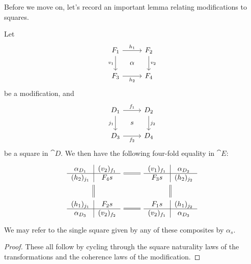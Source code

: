 \documentclass[DynamicalBook]{subfiles}
\begin{document}
Before we move on, let's record an important lemma relating modifications to squares.
\begin{lemma}
  Let
  \[
        \begin{tikzcd}[sep=tiny]
          F_1 \ar[dd, "v_1"'] \ar[rr, "h_1"] & & F_2
 \ar[dd, "v_2"] \\
           & \alpha & \\
          F_3 \ar[rr, "h_2"'] & & F_4
        \end{tikzcd}
  \]
  be a modification, and
  \[
        \begin{tikzcd}[sep=tiny]
          D_1 \ar[dd, "j_1"'] \ar[rr, "f_1"] & & D_2
 \ar[dd, "j_2"] \\
           & s & \\
          D_3 \ar[rr, "f_2"'] & & D_4
        \end{tikzcd}
  \]
  be a square in $\cat{D}$. We then have the following four-fold equality in $\cat{E}$:
  \[
    \begin{tikzcd}[ampersand replacement = \&]
  \begin{tabular}{c|c}
    $\alpha_{D_1}$ & $(v_2)_{f_1}$ \\ \hline
    $(h_2)_{j_1}$ & $F_4 s$
  \end{tabular}     \ar[r,
      equals] \ar[d, equals] \& \begin{tabular}{c|c}
    $(v_1)_{f_1}$ & $\alpha_{D_2}$ \\ \hline
    $F_3 s$ & $(h_2)_{j_2}$
  \end{tabular} \ar[d, equals]\\
   \begin{tabular}{c|c}
    $(h_1)_{j_1}$ & $F_2 s$ \\ \hline
  $\alpha_{D_3}$   & $(v_2)_{f_2}$
  \end{tabular}   \ar[r, equals] \&  \begin{tabular}{c|c}
    $F_1 s$ &  $(h_1)_{j_2}$ \\ \hline
    $(v_2)_{f_1}$ & $\alpha_{D_3}$
                                     \end{tabular}
\end{tikzcd}
  \]
 We may refer to the single square given by any of these composites by $\alpha_s$. 
\end{lemma}
\begin{proof}
These all follow by cycling through the square naturality laws of the
transformations and the coherence laws of the modification. 
\end{proof}
\end{document}
